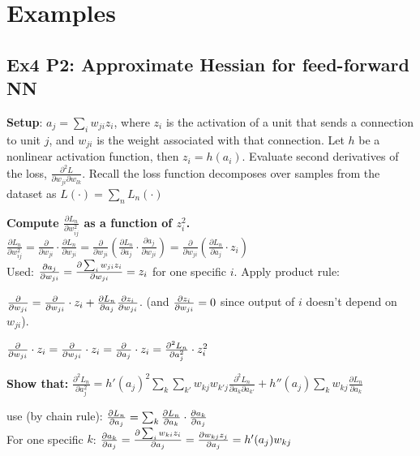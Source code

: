 \section*{Examples}
\subsection*{Ex4 P2: Approximate Hessian for feed-forward NN}
\textbf{Setup}: $a_j=\sum\limits_i w_{ji}z_i$, where $z_i$ is the activation of a unit that sends a connection to unit $j$, and $w_{ji}$ is the weight associated with that connection. Let $h$ be a nonlinear activation function, then $z_i=h(a_i)$. Evaluate second derivatives of the loss, $\frac{\partial^2 L}{\partial w_{ji} \partial w_{lk}}$. Recall the loss function decomposes over samples from the dataset as $L(\cdot)=\sum_n L_n(\cdot)$

\textbf{Compute $\frac{\partial L_n}{\partial w^2_{ij}}$ as a function of $z^2_i$.}\\

\tab$\frac{\partial L_n}{\partial w^2_{ij}}=\frac{\partial}{\partial w_{ji}}\cdot \frac{\partial L_n}{\partial w_{ji}}=\frac{\partial}{\partial w_{ji}}(\frac{\partial L_n}{\partial a_j}\cdot\frac{\partial a_j}{\partial w_{ji}})=\frac{\partial}{\partial w_{ji}}(\frac{\partial L_n}{\partial a_j}\cdot z_i)$\\

\tab Used: $\pdv{a_j}{w_{ji}}=\pdv{\sum_i w_{ji}z_i}{w_{ji}}=z_i$ for one specific $i$. Apply product rule:

\tab$\pdv{}{w_{ji}} (\pdv{L_n}{a_j}\cdot z_i)=\pdv{}{w_{ji}} (\pdv{L_n}{a_j})\cdot z_i+\pdv{L_n}{a_j}\pdv{z_i}{w_{ji}}$. (and $\pdv{z_i}{w_{ji}}=0$ since output of $i$ doesn't depend on $w_{ji}$).

\tab $\pdv{}{w_{ji}} ( \pdv{L_n}{a_j} )\cdot z_i=\pdv{}{w_{ji}} (\pdv{L_n}{w_{ji}})\cdot z_i=\pdv{}{a_j} (\pdv{L_n}{a_j}\pdv{a_j}{w_{ji}})\cdot z_i=\pdv[2]{L_n}{a_j}\cdot z_i^2$

\textbf{Show that:} $\frac{\partial^2 L_n}{\partial a_j^2}=h'(a_j)^2\sum\limits_k\sum\limits_{k'} w_{kj}w_{k'j}\frac{\partial^2 L_n}{\partial a_k \partial a_{k'}}+h''(a_j)\sum\limits_k w_{kj}\frac{\partial L_n}{\partial a_k}$

\tab use (by chain rule): $\pdv{L_n}{a_j} = \sum_k \pdv{L_n}{a_k} \cdot \pdv{a_k}{a_j}$\\
\tab For one specific $k$: $\pdv{a_k}{a_j} = \pdv{\sum_i w_{ki} z_i}{a_j} = \pdv{w_{kj} z_j}{a_j} = h'(a_j) w_{kj}$\\

